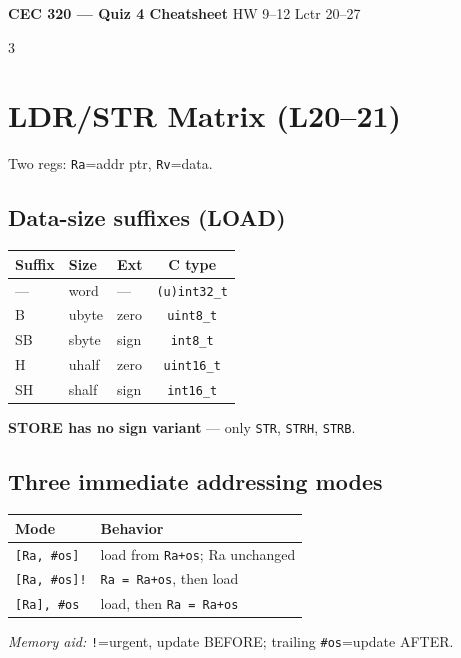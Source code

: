 \documentclass[8pt,landscape]{extarticle}
\newcommand{\asm}[1]{\texttt{\scriptsize #1}}
\begin{document}
\begin{center}
  \textbf{\large CEC 320 --- Quiz 4 Cheatsheet} \;
  \footnotesize HW 9--12 \textbullet{} Lctr 20--27
\end{center}
\vspace{-6pt}

\begin{multicols*}{3}

\section{LDR/STR Matrix (L20--21)}
Two regs: \texttt{Ra}=addr ptr, \texttt{Rv}=data.

\subsection{Data-size suffixes (LOAD)}
\begin{tabular}{@{}lllc@{}}
\toprule
Suffix & Size & Ext & C type \\
\midrule
---  & word      & ---  & \texttt{(u)int32\_t} \\
B    & ubyte     & zero & \texttt{uint8\_t}    \\
SB   & sbyte     & sign & \texttt{int8\_t}     \\
H    & uhalf     & zero & \texttt{uint16\_t}   \\
SH   & shalf     & sign & \texttt{int16\_t}    \\
\bottomrule
\end{tabular}

\textbf{STORE has no sign variant} --- only \texttt{STR}, \texttt{STRH}, \texttt{STRB}.

\subsection{Three immediate addressing modes}
\begin{tabular}{@{}ll@{}}
\toprule
Mode & Behavior \\
\midrule
\asm{[Ra, \#os]}  & load from \texttt{Ra+os}; Ra unchanged \\
\asm{[Ra, \#os]!} & \texttt{Ra = Ra+os}, then load \\
\asm{[Ra], \#os}  & load, then \texttt{Ra = Ra+os} \\
\bottomrule
\end{tabular}

\textit{Memory aid:} \texttt{!}=urgent, update BEFORE;
trailing \texttt{\#os}=update AFTER.


\end{multicols*}
\end{document}
